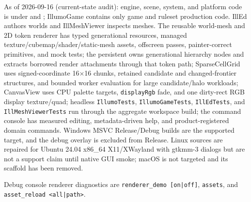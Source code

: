 \begin{statusbox}
As of 2026-09-16 (current-state audit): engine, scene, system, and platform code is
under  and ; IllumoGame contains
only game and ruleset production code. IllEd authors worlds and IllMeshViewer
inspects meshes. The reusable world-mesh and 2D token renderer has
typed generational resources, managed texture/cubemap/shader/static-mesh assets, offscreen passes, painter-correct
primitives, and mock tests; the persistent  owns
generational hierarchy nodes and extracts borrowed render attachments through
that token path;
SparseCellGrid uses signed-coordinate 16$\times$16 chunks, retained candidate
and changed-frontier structures, and bounded worker evaluation for large
candidate/halo workloads; CanvasView uses CPU palette targets, \texttt{displayRgb}
fade, and one dirty-rect RGB display texture/quad; headless
\texttt{IllumoTests}, \texttt{IllumoGameTests}, \texttt{IllEdTests}, and
\texttt{IllMeshViewerTests} run through the aggregate
workspace build; the command console has measured editing,
metadata-driven help, and product-registered domain commands. Windows MSVC
Release/Debug builds are the supported target, and the debug overlay is
excluded from Release. Linux sources are repaired for Ubuntu 24.04 x86\_64 X11/XWayland
with gtkmm-3 dialogs but are not a support claim until native GUI smoke;
macOS is not targeted and its scaffold has been removed.
\end{statusbox}

Debug console renderer diagnostics are \texttt{renderer\_demo [on|off]},
\texttt{assets}, and \texttt{asset\_reload <all|path>}.
